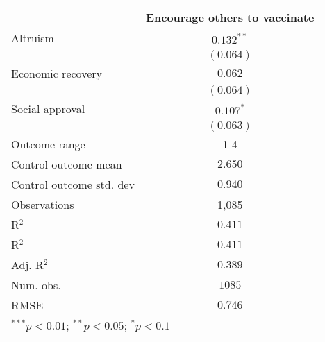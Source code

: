 
\begin{table}
\begin{center}
\begin{tabular}{l c}
\hline
 & Encourage others to vaccinate \\
\hline
Altruism                 & $0.132^{**}$ \\
                         & $(0.064)$    \\
Economic recovery        & $0.062$      \\
                         & $(0.064)$    \\
Social approval          & $0.107^{*}$  \\
                         & $(0.063)$    \\
\hline
Outcome range            & 1-4          \\
Control outcome mean     & $2.650$      \\
Control outcome std. dev & $0.940$      \\
Observations             & 1,085        \\
R$^{2}$                  & $0.411$      \\
R$^2$                    & $0.411$      \\
Adj. R$^2$               & $0.389$      \\
Num. obs.                & $1085$       \\
RMSE                     & $0.746$      \\
\hline
\multicolumn{2}{l}{\scriptsize{$^{***}p<0.01$; $^{**}p<0.05$; $^{*}p<0.1$}}
\end{tabular}
\caption{}
\label{table:Tables and Figures/SI_table23_motiv_Colombia_encourage1-4}
\end{center}
\end{table}

